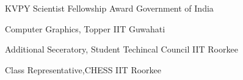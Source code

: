 

\begin{cvhonors}

  \cvhonor
    {KVPY Scientist Fellowship Award} %
    {Government of India} %
    {} %
    {} %

  \cvhonor
    {Computer Graphics, Topper} %
    {IIT Guwahati} %
    {} %
    {} %

\cvhonor
    {Additional Seceratory, Student Techincal Council} %
    {IIT Roorkee} %
    {} %
    {} %

\cvhonor
    {Class Representative,CHESS} %
    {IIT Roorkee} %
    {} %
    {} %


\end{cvhonors}
